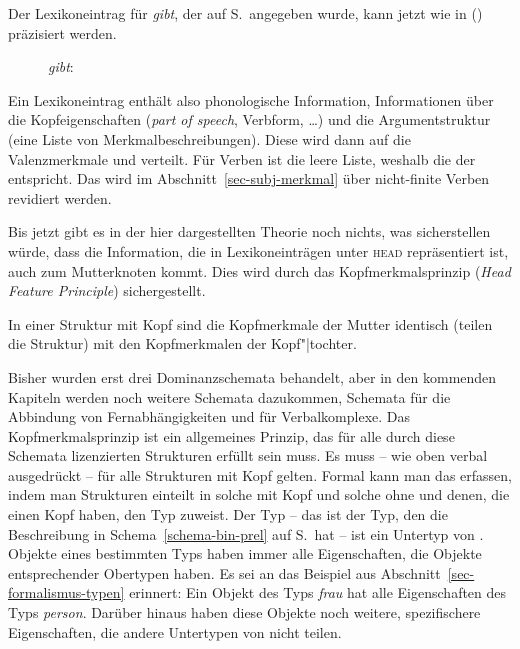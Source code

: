 \noindent
Der Lexikoneintrag für \emph{gibt}, der auf S.\,\pageref{le-gibt-1}
angegeben wurde, kann jetzt wie in () präzisiert werden.
\begin{figure}
\ea
\emph{gibt}:\\
\z
\vspace{-2\baselineskip}
\end{figure}
Ein Lexikoneintrag enthält also phonologische Information, Informationen über die Kopfeigenschaften
(\emph{part of speech}, Verbform, \ldots) und die Argumentstruktur (eine Liste von
Merkmalbeschreibungen). Diese wird dann auf die Valenzmerkmale \spr und \comps verteilt. Für Verben
ist \spr die leere Liste, weshalb die \compsl der \argstl entspricht. Das wird im
Abschnitt~\ref{sec-subj-merkmal} über nicht-finite Verben revidiert werden.

\noindent
Bis jetzt gibt es in der hier dargestellten Theorie noch nichts, was sicherstellen
würde, dass die Information, die in Lexikoneinträgen unter \textsc{head} repräsentiert
ist, auch zum Mutterknoten kommt. Dies wird durch das Kopfmerkmalsprinzip (\emph{Head Feature Principle})
sichergestellt.
\begin{prinzip-break}
\label{prinzip-hfp}
In einer Struktur mit Kopf sind die Kopfmerkmale der Mutter identisch (teilen die Struktur)
mit den Kopfmerkmalen der Kopf"|tochter.
\end{prinzip-break}
Bisher wurden erst drei Dominanzschemata behandelt, aber in den kommenden Kapiteln werden
noch weitere Schemata dazukommen, \zb Schemata für die Abbindung von Fernabhängigkeiten und für Verbalkomplexe. Das Kopfmerkmalsprinzip ist ein allgemeines Prinzip,
das für alle durch diese Schemata lizenzierten Strukturen erfüllt sein muss. Es muss --
wie oben verbal ausgedrückt -- für alle Strukturen mit Kopf gelten. Formal kann man
das erfassen, indem man Strukturen einteilt in solche mit Kopf und solche ohne
und denen, die einen Kopf haben, den Typ  zuweist.
Der Typ  -- das ist der Typ, den die Beschreibung in
Schema~\ref{schema-bin-prel} auf S.\,\pageref{schema-bin-prel} hat -- ist ein Untertyp
von . Objekte eines bestimmten Typs haben immer 
alle Eigenschaften, die Objekte entsprechender Obertypen haben. Es sei an das Beispiel
aus Abschnitt~\ref{sec-formalismus-typen} erinnert: Ein Objekt des Typs \textit{frau}
hat alle Eigenschaften des Typs \textit{person}. Darüber hinaus haben diese Objekte
noch weitere, spezifischere Eigenschaften, die andere Untertypen von 
nicht teilen.

